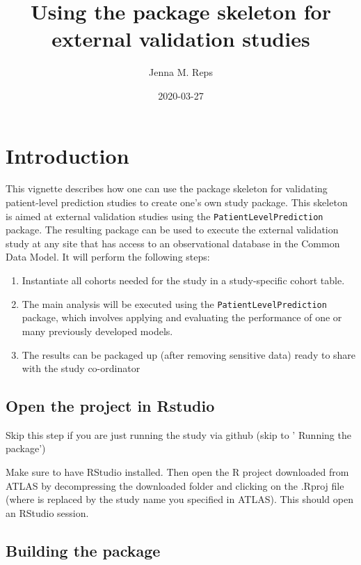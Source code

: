 \documentclass[
]{article}
\title{Using the package skeleton for external validation studies}
\author{Jenna M. Reps}
\date{2020-03-27}
\providecommand{\tightlist}{%
  \setlength{\itemsep}{0pt}\setlength{\parskip}{0pt}}
\begin{document}
\maketitle

{
\setcounter{tocdepth}{2}
\tableofcontents
}
\hypertarget{introduction}{%
\section{Introduction}\label{introduction}}

This vignette describes how one can use the package skeleton for
validating patient-level prediction studies to create one's own study
package. This skeleton is aimed at external validation studies using the
\texttt{PatientLevelPrediction} package. The resulting package can be
used to execute the external validation study at any site that has
access to an observational database in the Common Data Model. It will
perform the following steps:

\begin{enumerate}
\def\labelenumi{\arabic{enumi}.}
\tightlist
\item
  Instantiate all cohorts needed for the study in a study-specific
  cohort table.
\item
  The main analysis will be executed using the
  \texttt{PatientLevelPrediction} package, which involves applying and
  evaluating the performance of one or many previously developed models.
\item
  The results can be packaged up (after removing sensitive data) ready
  to share with the study co-ordinator
\end{enumerate}

\hypertarget{open-the-project-in-rstudio}{%
\subsection{Open the project in
Rstudio}\label{open-the-project-in-rstudio}}

Skip this step if you are just running the study via github (skip to '
Running the package')

Make sure to have RStudio installed. Then open the R project downloaded
from ATLAS by decompressing the downloaded folder and clicking on the
.Rproj file (where is replaced by the study name you specified in
ATLAS). This should open an RStudio session.

\hypertarget{building-the-package}{%
\subsection{Building the package}\label{building-the-package}}
\end{document}
